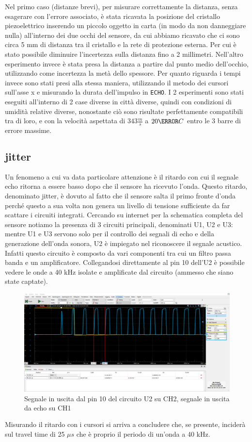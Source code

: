 \documentclass[10pt, a4paper, italian]{article}
\begin{document}
Nel primo caso (distanze brevi), per misurare correttamente la distanza, senza esagerare con l'errore associato, è stata ricavata la posizione del cristallo piezoelettrico inserendo un piccolo oggetto in carta (in modo da non danneggiare nulla) all'interno dei due occhi del sensore, da cui abbiamo ricavato che ci sono circa 5 mm di distanza tra il cristallo e la rete di protezione esterna. Per cui è stato possibile diminuire l'incertezza sulla distanza fino a 2 millimetri. Nell'altro esperimento invece è stata presa la distanza a partire dal punto medio dell'occhio, utilizzando come incertezza la metà dello spessore. Per quanto riguarda i tempi invece sono stati presi alla stessa maniera, utilizzando il metodo dei cursori sull'asse x e misurando la durata dell'impulso in \verb+ECHO+. I 2 esperimenti sono stati eseguiti all'interno di 2 case diverse in città diverse, quindi con condizioni di umidità relative diverse, nonostante ciò sono risultate perfettamente compatibili tra di loro, e con la velocità aspettata di $343 \frac{m}{s}$ a $20 \degree C$ entro le 3 barre di errore massime.
\subsection{jitter}
Un fenomeno a cui va data particolare attenzione è il ritardo con cui il segnale echo ritorna a essere basso dopo che il sensore ha ricevuto l'onda. Questo ritardo, denominato jitter, è dovuto al fatto che il sensore salta il primo fronte d'onda perché questo a sua volta non genera un livello di tensione sufficiente da far scattare i circuiti integrati. Cercando su internet per la schematica completa del sensore notiamo la presenza di 3 circuiti principali, denominati U1, U2 e U3: mentre U1 e U3 servono solo per il controllo dei segnali di echo e della generazione dell'onda sonora, U2 è impiegato nel riconoscere il segnale acustico.
Infatti questo circuito è composto da vari componenti tra cui un filtro passa banda e un amplificatore. Collegandosi direttamente al pin 10 dell'U2 è possibile vedere le onde a 40 kHz isolate e amplificate dal circuito (ammesso che siano state captate).
\begin{figure}[htbp]
    \centering
	\includegraphics[width=\textwidth]{jitter2}
    \caption{Segnale in uscita dal pin 10 del circuito U2 su CH2, segnale in uscita da echo su CH1}
\end{figure}
Misurando il ritardo con i cursori si arriva a concludere che, se presente, inciderà sul travel time di 25 $\mu s$ che è proprio il periodo di un'onda a 40 kHz.
\end{document}
